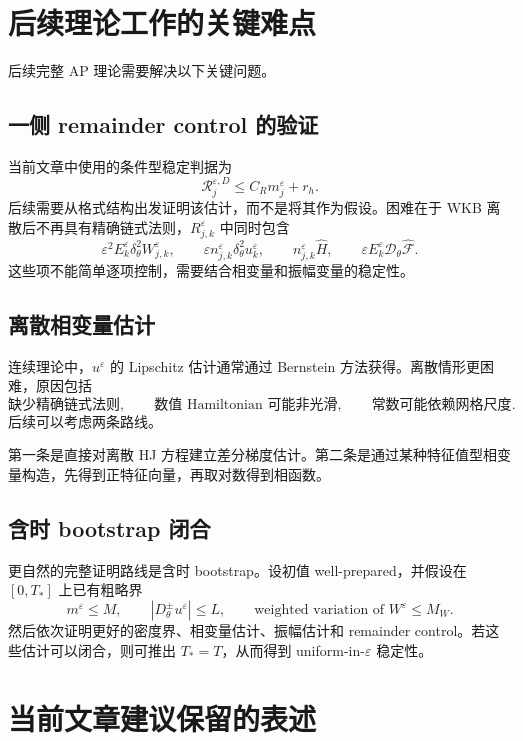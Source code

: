 \documentclass[11pt,a4paper]{ctexart}
\begin{document}
\newpage

\section{后续理论工作的关键难点}

后续完整 AP 理论需要解决以下关键问题。

\subsection{一侧 remainder control 的验证}

当前文章中使用的条件型稳定判据为
\[
    \mathcal R_j^{\varepsilon,D}
    \le
    C_R m_j^\varepsilon+r_h.
\]
后续需要从格式结构出发证明该估计，而不是将其作为假设。困难在于 WKB 离散后不再具有精确链式法则，\(R_{j,k}^\varepsilon\) 中同时包含
\[
\varepsilon^2 E_k^\varepsilon\delta_\theta^2 W_{j,k}^\varepsilon,
\qquad
\varepsilon n_{j,k}^\varepsilon\delta_\theta^2u_k^\varepsilon,
\qquad
n_{j,k}^\varepsilon\widehat H,
\qquad
\varepsilon E_k^\varepsilon\mathcal D_\theta\widehat{\mathcal F}.
\]
这些项不能简单逐项控制，需要结合相变量和振幅变量的稳定性。

\subsection{离散相变量估计}

连续理论中，\(u^\varepsilon\) 的 Lipschitz 估计通常通过 Bernstein 方法获得。离散情形更困难，原因包括
\[
\text{缺少精确链式法则},
\qquad
\text{数值 Hamiltonian 可能非光滑},
\qquad
\text{常数可能依赖网格尺度}.
\]
后续可以考虑两条路线。

第一条是直接对离散 HJ 方程建立差分梯度估计。第二条是通过某种特征值型相变量构造，先得到正特征向量，再取对数得到相函数。

\subsection{含时 bootstrap 闭合}

更自然的完整证明路线是含时 bootstrap。设初值 well-prepared，并假设在 \([0,T_*]\) 上已有粗略界
\[
    m^\varepsilon\le M,
    \qquad
    |D_\theta^\pm u^\varepsilon|\le L,
    \qquad
    \text{weighted variation of } W^\varepsilon \le M_W.
\]
然后依次证明更好的密度界、相变量估计、振幅估计和 remainder control。若这些估计可以闭合，则可推出 \(T_*=T\)，从而得到 uniform-in-\(\varepsilon\) 稳定性。

\section{当前文章建议保留的表述}
\end{document}
